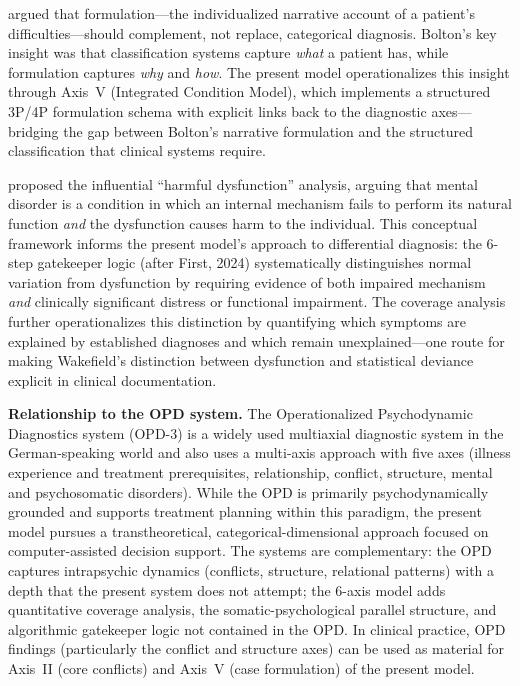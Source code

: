 \documentclass[11pt,a4paper]{article}
\begin{document}
\citet{Bolton2008} argued that formulation---the individualized narrative account of a patient's difficulties---should complement, not replace, categorical diagnosis. Bolton's key insight was that classification systems capture \textit{what} a patient has, while formulation captures \textit{why} and \textit{how}. The present model operationalizes this insight through Axis~V (Integrated Condition Model), which implements a structured 3P/4P formulation schema with explicit links back to the diagnostic axes---bridging the gap between Bolton's narrative formulation and the structured classification that clinical systems require.

\citet{Wakefield1992} proposed the influential ``harmful dysfunction'' analysis, arguing that mental disorder is a condition in which an internal mechanism fails to perform its natural function \textit{and} the dysfunction causes harm to the individual. This conceptual framework informs the present model's approach to differential diagnosis: the 6-step gatekeeper logic (after First, 2024) systematically distinguishes normal variation from dysfunction by requiring evidence of both impaired mechanism \textit{and} clinically significant distress or functional impairment. The coverage analysis further operationalizes this distinction by quantifying which symptoms are explained by established diagnoses and which remain unexplained---one route for making Wakefield's distinction between dysfunction and statistical deviance explicit in clinical documentation.

\textbf{Relationship to the OPD system.} The Operationalized Psychodynamic Diagnostics system (OPD-3) is a widely used multiaxial diagnostic system in the German-speaking world and also uses a multi-axis approach with five axes (illness experience and treatment prerequisites, relationship, conflict, structure, mental and psychosomatic disorders). While the OPD is primarily psychodynamically grounded and supports treatment planning within this paradigm, the present model pursues a transtheoretical, categorical-dimensional approach focused on computer-assisted decision support. The systems are complementary: the OPD captures intrapsychic dynamics (conflicts, structure, relational patterns) with a depth that the present system does not attempt; the 6-axis model adds quantitative coverage analysis, the somatic-psychological parallel structure, and algorithmic gatekeeper logic not contained in the OPD. In clinical practice, OPD findings (particularly the conflict and structure axes) can be used as material for Axis~II (core conflicts) and Axis~V (case formulation) of the present model.
\end{document}
